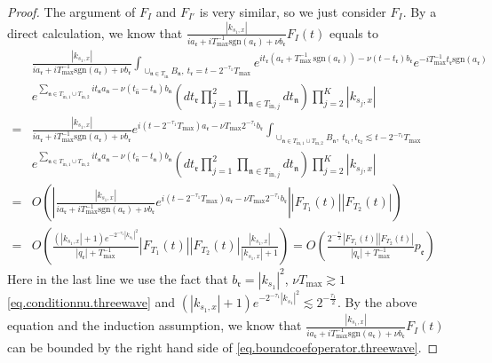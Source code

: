 \begin{proof}
The argument of $F_{I}$ and $F_{I'}$ is very similar, so we just consider $F_{I}$. By a direct calculation, we know that $\frac{|k_{s_1,x}|}{ia_{\mathfrak{r}}+iT^{-1}_{\text{max}} \text{sgn}(a_{\mathfrak{r}})+\nu b_{\mathfrak{r}} }F_{I}(t)$ equals to
\begin{equation}
    \begin{split}
        &\frac{|k_{s_1,x}|}{ia_{\mathfrak{r}}+iT^{-1}_{\text{max}} \text{sgn}(a_{\mathfrak{r}})+\nu b_{\mathfrak{r}} } \int_{\cup_{\mathfrak{n}\in T_{\text{in}}} B_{\mathfrak{n}},\ t_{\mathfrak{r}}=t-2^{-\tau_{1}}T_{\text{max}}} e^{it_{\mathfrak{r}}(a_{\mathfrak{r}}+T^{-1}_{\text{max}}\, \text{sgn}(a_{\mathfrak{r}}))- \nu(t-t_{\mathfrak{r}})b_{\mathfrak{r}}} e^{-iT^{-1}_{\text{max}}t_{\mathfrak{r}} \text{sgn}(a_{\mathfrak{r}})} 
        \\
        &e^{\sum_{\mathfrak{n}\in T_{\text{in},1}\cup T_{\text{in},2}} it_{\mathfrak{n}} a_{\mathfrak{n}} - \nu(t_{\widehat{\mathfrak{n}}}-t_{\mathfrak{n}})b_{\mathfrak{n}}} \left(dt_{\mathfrak{r}}\prod_{j=1}^2\prod_{\mathfrak{n}\in T_{\text{in},j}}dt_{\mathfrak{n}}  \right)\prod^K_{j=2}|k_{s_j,x}|
        \\
        =&\frac{|k_{s_1,x}|}{ia_{\mathfrak{r}}+iT^{-1}_{\text{max}} \text{sgn}(a_{\mathfrak{r}})+\nu b_{\mathfrak{r}} }  e^{i(t-2^{-\tau_{1}}T_{\text{max}})a_{\mathfrak{r}}- \nu T_{\text{max}} 2^{-\tau_{1}}b_{\mathfrak{r}}}\int_{\cup_{\mathfrak{n}\in T_{\text{in},1}\cup T_{\text{in},2}} B_{\mathfrak{n}},\ t_{\mathfrak{r}_1}, t_{\mathfrak{r}_2}\lesssim t-2^{-\tau_{1}}T_{\text{max}}}
        \\
        &  e^{\sum_{\mathfrak{n}\in T_{\text{in},1}\cup T_{\text{in},2}} it_{\mathfrak{n}} a_{\mathfrak{n}} - \nu(t_{\widehat{\mathfrak{n}}}-t_{\mathfrak{n}})b_{\mathfrak{n}}}\left(dt_{\mathfrak{r}}\prod_{j=1}^2\prod_{\mathfrak{n}\in T_{\text{in},j}}dt_{\mathfrak{n}}  \right)\prod^K_{j=2}|k_{s_j,x}|
        \\
        =&O\left(\left|\frac{|k_{s_1,x}|}{ia_{\mathfrak{r}}+iT^{-1}_{\text{max}} \text{sgn}(a_{\mathfrak{r}})+\nu b_{\mathfrak{r}} }  e^{i(t-2^{-\tau_{1}}T_{\text{max}})a_{\mathfrak{r}}- \nu T_{\text{max}} 2^{-\tau_{1}}b_{\mathfrak{r}}}\right||F_{T_1}(t)| |F_{T_2}(t)|\right)
        \\
        =&O\left(\frac{(|k_{s_1,x}|+1)e^{- 2^{-\tau_{1}}|k_{s_1}|^2} }{|q_{\mathfrak{r}}|+T^{-1}_{\text{max}}} |F_{T_1}(t)| |F_{T_2}(t)|\frac{|k_{s_1,x}|}{|k_{s_1,x}|+1}\right)=O\left(\frac{2^{-\frac{\tau_{1}}{2}}|F_{T_1}(t)| |F_{T_2}(t)|}{|q_{\mathfrak{r}}|+T^{-1}_{\text{max}}}p_{\mathfrak{e}}\right)
    \end{split}
\end{equation}
Here in the last line we use the fact that $b_{\mathfrak{r}}=|k_{s_1}|^2$, $\nu T_{\text{max}}\gtrsim 1$ \eqref{eq.conditionnu.threewave} and $(|k_{s_1,x}|+1)e^{- 2^{-\tau_{1}}|k_{s_1}|^2} \lesssim 2^{-\frac{\tau_{1}}{2}}$. By the above equation and the induction assumption, we know that $\frac{|k_{s_1,x}|}{ia_{\mathfrak{r}}+iT^{-1}_{\text{max}} \text{sgn}(a_{\mathfrak{r}})+\nu b_{\mathfrak{r}} }F_{I}(t)$ can be bounded by the right hand side of \eqref{eq.boundcoefoperator.threewave}.


\end{proof}
